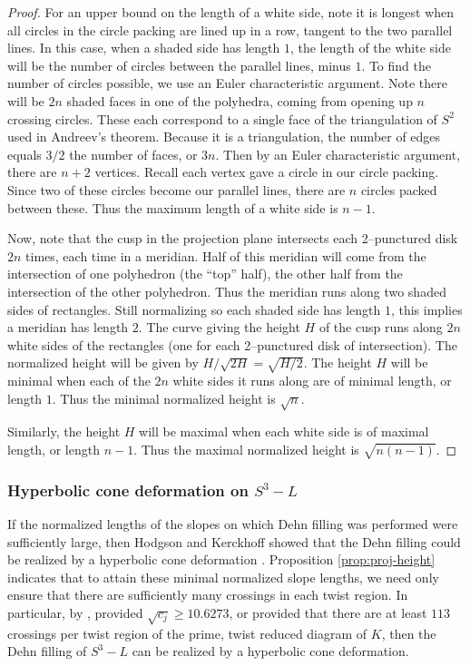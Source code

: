 \begin{proof}
For an upper bound on the length of a white side, note it is longest
when all circles in the circle packing are lined up in a row, tangent
to the two parallel lines.  In this case, when a shaded side has
length $1$, the length of the white side will be the number of circles
between the parallel lines, minus $1$.  To find the number of circles
possible, we use an Euler characteristic argument.  Note there will be
$2n$ shaded faces in one of the polyhedra, coming from opening up $n$
crossing circles.  These each correspond to a single face of the
triangulation of $S^2$ used in Andreev's theorem.  Because it is a
triangulation, the number of edges equals $3/2$ the number of faces,
or $3n$.  Then by an Euler characteristic argument, there are $n+2$
vertices.  Recall each vertex gave a circle in our circle packing.
Since two of these circles become our parallel lines, there are $n$
circles packed between these.  Thus the maximum length of a white side
is $n-1$.

Now, note that the cusp in the projection plane intersects each
2--punctured disk $2n$ times, each time in a meridian.  Half of this
meridian will come from the intersection of one polyhedron (the
``top'' half), the other half from the intersection of the other
polyhedron.  Thus the meridian runs along two shaded sides of
rectangles.  Still normalizing so each shaded side has length $1$,
this implies a meridian has length $2$.  The curve giving the height
$H$ of the cusp runs along $2n$ white sides of the rectangles (one for
each 2--punctured disk of intersection).  The normalized height will
be given by $H/\sqrt{2H} = \sqrt{H/2}.$ The height $H$ will be minimal
when each of the $2n$ white sides it runs along are of minimal length,
or length $1$.  Thus the minimal normalized height is $\sqrt{n}$.

Similarly, the height $H$ will be maximal when each white side is of
maximal length, or length $n-1$.  Thus the maximal normalized height
is $\sqrt{n(n-1)}$.
\end{proof}


\subsubsection{Hyperbolic cone deformation on $S^3-L$}
  \label{subsec:crossings}

If the normalized lengths of the slopes on which {D}ehn filling was
performed were sufficiently large, then Hodgson and Kerckhoff showed
that the {D}ehn filling could be realized by a hyperbolic cone
deformation \cite{hk:univ}.  Proposition \ref{prop:proj-height}
indicates that to attain these minimal normalized slope lengths, we
need only ensure that there are sufficiently many crossings in each
twist region.  In particular, by \cite{hk:univ}, provided $\sqrt{c_j}
\geq 10.6273$, or provided that there are at least $113$ crossings per
twist region of the prime, twist reduced diagram of $K$, then the
{D}ehn filling of $S^3-L$ can be realized by a hyperbolic cone
deformation.

